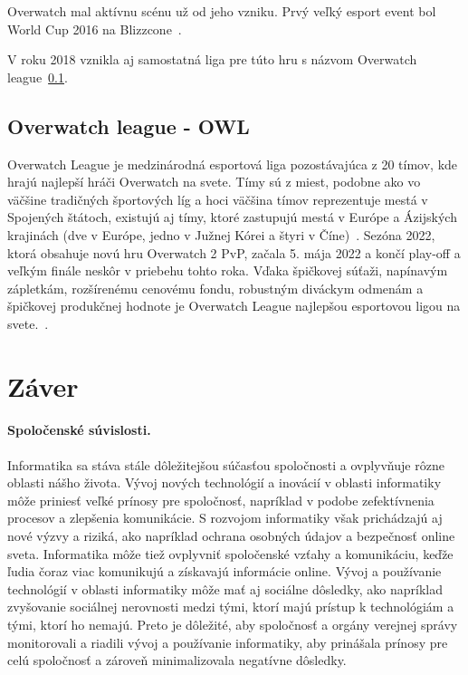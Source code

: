 \documentclass[10pt,oneside,slovak,a4paper]{article}
\begin{document}
Overwatch mal aktívnu scénu už od jeho vzniku. Prvý veľký esport event bol World Cup 2016 na Blizzcone~\cite{Overwatchesport}.

V roku 2018 vznikla aj samostatná liga pre túto hru s názvom Overwatch league~\ref{Overwatch league - OWL}.

\subsection{Overwatch league - OWL} \label{Overwatch league - OWL}

Overwatch League je medzinárodná esportová liga pozostávajúca z 20 tímov, kde hrajú najlepší hráči Overwatch na svete. Tímy sú z miest, podobne ako vo väčšine tradičných športových líg a hoci väčšina tímov reprezentuje mestá v Spojených štátoch, existujú aj tímy, ktoré zastupujú mestá v Európe a Ázijských krajinách (dve v Európe, jedno v Južnej Kórei a štyri v Číne)~\cite{Overwatchesport}. Sezóna 2022, ktorá obsahuje novú hru Overwatch 2 PvP, začala 5. mája 2022 a končí play-off a veľkým finále neskôr v priebehu tohto roka. Vďaka špičkovej súťaži, napínavým zápletkám, rozšírenému cenovému fondu, robustným diváckym odmenám a špičkovej produkčnej hodnote je Overwatch League najlepšou esportovou ligou na svete.~\cite{Overwatchsite}.



\section{Záver} \label{zaver} %



\paragraph{Spoločenské súvislosti.}

Informatika sa stáva stále dôležitejšou súčasťou spoločnosti a ovplyvňuje rôzne oblasti nášho života.
Vývoj nových technológií a inovácií v oblasti informatiky môže priniesť veľké prínosy pre spoločnosť, napríklad v podobe zefektívnenia procesov a zlepšenia komunikácie. S rozvojom informatiky však prichádzajú aj nové výzvy a riziká, ako napríklad ochrana osobných údajov a bezpečnosť online sveta.
Informatika môže tiež ovplyvniť spoločenské vzťahy a komunikáciu, keďže ľudia čoraz viac komunikujú a získavajú informácie online.
Vývoj a používanie technológií v oblasti informatiky môže mať aj sociálne dôsledky, ako napríklad zvyšovanie sociálnej nerovnosti medzi tými, ktorí majú prístup k technológiám a tými, ktorí ho nemajú. Preto je dôležité, aby spoločnosť a orgány verejnej správy monitorovali a riadili vývoj a používanie informatiky, aby prinášala prínosy pre celú spoločnosť a zároveň minimalizovala negatívne dôsledky.
\end{document}
